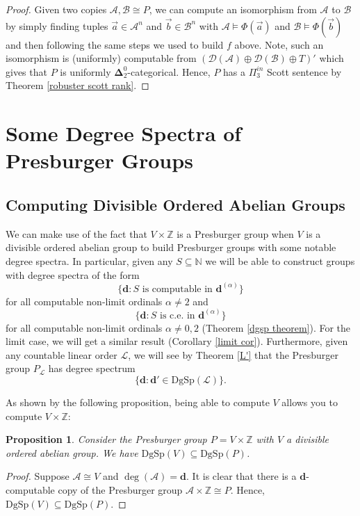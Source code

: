 \documentclass{amsart}%
\numberwithin{theorem}{section}
\newtheorem{proposition}[theorem]{Proposition}
\newcommand{\Z}{\mathbb{Z}}
\newcommand{\N}{\mathbb{N}}
\newcommand{\A}{\mathcal{A}}
\newcommand{\B}{\mathcal{B}}
\newcommand{\D}{\mathcal{D}}
\newcommand{\0}{\emptyset}
\newcommand{\ddd}{\boldsymbol{d}}
\newcommand{\LL}{\mathcal{L}}
\newcommand{\dgsp}{\text{DgSp}}
\begin{document}
\begin{proof}
    Given two copies $\A,\B\cong P$, we can compute an isomorphism from $\A$ to $\B$ by simply finding tuples $\vec a\in \A^n$ and $\vec b\in \B^n$ with $\A\models \Phi(\vec a)$ and $\B\models \Phi(\vec b)$ and then following the same steps we used to build $f$ above. Note, such an isomorphism is (uniformly) computable from $(\D(\A)\oplus \D(\B) \oplus T)'$ which gives that $P$ is uniformly $\boldsymbol{\Delta}^0_2$-categorical. Hence, $P$ has a $\Pi^{in}_3$ Scott sentence by Theorem \ref{robuster scott rank}.   \end{proof}

\section{Some Degree Spectra of Presburger Groups}
\label{dgsp chapter}


 

\subsection{Computing Divisible Ordered Abelian Groups}

We can make use of the fact that $V\times \Z$ is a Presburger group when $V$ is a divisible ordered abelian group to build Presburger groups with some notable degree spectra. In particular, given any $S\subseteq \N$ we will be able to construct groups with degree spectra of the form $$\{\ddd: S \text{ is computable in } \ddd^{(\alpha)}\}$$ for all computable non-limit ordinals $\alpha\neq 2$ and $$\{\ddd: S \text{ is c.e.\ in } \ddd^{(\alpha)}\}$$ for all computable non-limit ordinals $\alpha\neq 0,2$ (Theorem \ref{dgsp theorem}). For the limit case, we will get a similar result (Corollary \ref{limit cor}).  Furthermore, given any countable linear order $\LL$, we will see by Theorem \ref{L'} that the Presburger group $P_\LL$ has degree spectrum $$\{\ddd:\ddd'\in \dgsp(\LL)\}.$$

As shown by the following proposition, being able to compute $V$ allows you to compute $V\times \Z$:

\begin{proposition}
\label{dgsp}
Consider the Presburger group $P=V \times \Z$ with $V$ a divisible ordered abelian group. We have $\dgsp(V)\subseteq \dgsp(P) $.
\end{proposition}

\begin{proof}
Suppose $\A\cong V$ and $\deg(\A)=\ddd$. It is clear that there is a $\ddd$-computable copy of the Presburger group $\A \times \Z\cong P$. Hence, $\dgsp(V)\subseteq \dgsp(P)$.
\end{proof}
\end{document}
